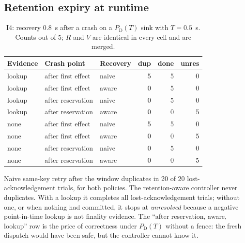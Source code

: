 \documentclass[conference,10pt]{IEEEtran}
\newcommand{\PDT}{P_{\mathrm{D}}(T)}
\begin{document}
\subsection{Retention expiry at runtime}
\begin{table}[t]
\centering\footnotesize
\caption{I4: recovery 0.8~s after a crash on a $\PDT$ sink with $T=0.5$~s. Counts out of 5; $R$ and $V$ are identical in every cell and are merged.}
\label{tab:i4}
\begin{tabular}{@{}lllrrr@{}}
\toprule
Evidence & Crash point & Recovery & dup & done & unres\\
\midrule
lookup & after first effect & naive & 5 & 5 & 0\\
lookup & after first effect & aware & 0 & 5 & 0\\
lookup & after reservation & naive & 0 & 5 & 0\\
lookup & after reservation & aware & 0 & 0 & 5\\
none & after first effect & naive & 5 & 5 & 0\\
none & after first effect & aware & 0 & 0 & 5\\
none & after reservation & naive & 0 & 5 & 0\\
none & after reservation & aware & 0 & 0 & 5\\
\bottomrule
\end{tabular}
\end{table}
Naive same-key retry after the window duplicates in 20 of 20 lost-acknowledgement trials, for both policies. The retention-aware controller never duplicates. With a lookup it completes all lost-acknowledgement trials; without one, or when nothing had committed, it stops at \emph{unresolved} because a negative point-in-time lookup is not finality evidence. The ``after reservation, aware, lookup'' row is the price of correctness under $\PDT$ without a fence: the fresh dispatch would have been safe, but the controller cannot know it.
\end{document}
